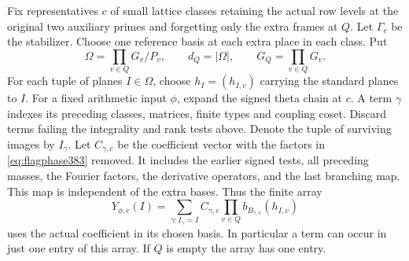 \documentclass[a4paper,11pt]{article}
\theoremstyle{definition}
\theoremstyle{remark}
\numberwithin{equation}{section}
\begin{document}
Fix representatives \(c\) of small lattice classes retaining the
actual row levels at the original two auxiliary primes and forgetting
only the extra frames at \(Q\). Let \(\Gamma_c\) be the stabilizer.
Choose one reference basis at each extra place in each class.
Put
\[
 \Omega=\prod_{v\in Q}G_v/P_v,\qquad
 d_Q=|\Omega|,\qquad G_Q=\prod_{v\in Q}G_v.
\]
For each tuple of planes \(I\in\Omega\), choose
\(h_I=(h_{I,v})\) carrying the standard planes to \(I\).
For a fixed arithmetic input \(\phi\), expand the signed
theta chain at \(c\). A term \(\gamma\) indexes its preceding
classes, matrices, finite types and coupling coset. Discard
terms failing the integrality and rank tests above. Denote the
tuple of surviving images by \(I_\gamma\). Let \(C_{\gamma,c}\)
be the coefficient vector with the factors in
\eqref{eq:flagphase383} removed. It includes the earlier signed
tests, all preceding masses, the Fourier factors, the derivative
operators, and the last branching map. This map is independent
of the extra bases. Thus the finite array
\begin{equation}
 Y_{\phi,c}(I)=
    \sum_{\gamma:I_\gamma=I} C_{\gamma,c}
                       \prod_{v\in Q} b_{B_{\gamma,v}}(h_{I,v})
 \label{eq:flagarray383}
\end{equation}
uses the actual coefficient in its chosen basis. In particular
a term can occur in just one entry of this array. If \(Q\) is
empty the array has one entry.
\end{document}
